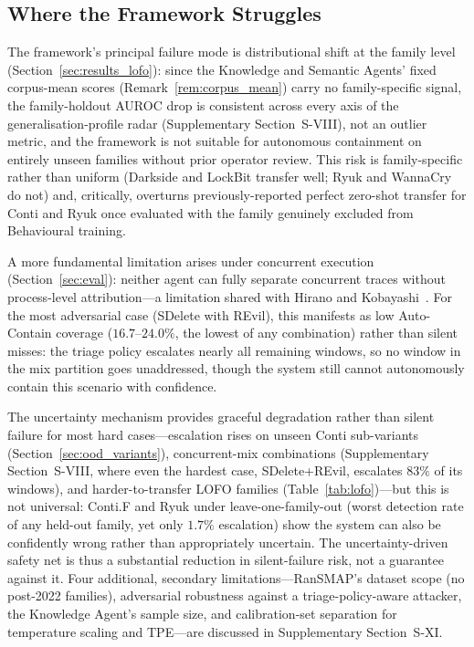 \documentclass[journal]{IEEEtran}
\begin{document}
\subsection{Where the Framework Struggles}\label{sec:limitations}

The framework's principal failure mode is distributional shift at the
family level (Section~\ref{sec:results_lofo}): since the Knowledge and
Semantic Agents' fixed corpus-mean scores (Remark~\ref{rem:corpus_mean})
carry no family-specific signal, the family-holdout AUROC drop is
consistent across every axis of the generalisation-profile radar
(Supplementary Section~S-VIII), not an outlier metric, and the framework
is not suitable for autonomous containment on entirely unseen families
without prior operator review. This risk is family-specific rather than
uniform (Darkside and LockBit transfer well; Ryuk and WannaCry do not)
and, critically, overturns previously-reported perfect zero-shot transfer
for Conti and Ryuk once evaluated with the family genuinely excluded from
Behavioural training.

A more fundamental limitation arises under concurrent execution
(Section~\ref{sec:eval}): neither agent can fully separate concurrent
traces without process-level attribution---a limitation shared with
Hirano and Kobayashi~\cite{hirano2025ransmap}. For the most adversarial
case (SDelete with REvil), this manifests as low Auto-Contain coverage
($16.7$--$24.0\%$, the lowest of any combination) rather than silent
misses: the triage policy escalates nearly all remaining windows, so no
window in the mix partition goes unaddressed, though the system still
cannot autonomously contain this scenario with confidence.

The uncertainty mechanism provides graceful degradation rather than
silent failure for most hard cases---escalation rises on unseen Conti
sub-variants (Section~\ref{sec:ood_variants}), concurrent-mix
combinations (Supplementary Section~S-VIII, where even the hardest case,
SDelete+REvil, escalates $83\%$ of its windows), and harder-to-transfer
LOFO families (Table~\ref{tab:lofo})---but this is not universal: Conti.F
and Ryuk under leave-one-family-out (worst detection rate of any held-out
family, yet only $1.7\%$ escalation) show the system can also be
confidently wrong rather than appropriately uncertain. The
uncertainty-driven safety net is thus a substantial reduction in
silent-failure risk, not a guarantee against it. Four additional,
secondary limitations---RanSMAP's dataset scope (no post-2022 families),
adversarial robustness against a triage-policy-aware attacker, the
Knowledge Agent's sample size, and calibration-set separation for
temperature scaling and TPE---are discussed in Supplementary
Section~S-XI.
\end{document}
